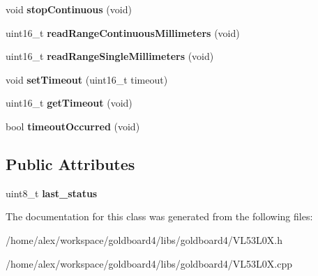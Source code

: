 \begin{DoxyCompactItemize}
\item 
void {\bfseries stop\+Continuous} (void)\hypertarget{class_v_l53_l0_x_aaa035aea7642fbf97e7946a1159ca5a5}{}\label{class_v_l53_l0_x_aaa035aea7642fbf97e7946a1159ca5a5}

\item 
uint16\+\_\+t {\bfseries read\+Range\+Continuous\+Millimeters} (void)\hypertarget{class_v_l53_l0_x_a198b2629c8d805ce23b2b2dd3c3cf7cf}{}\label{class_v_l53_l0_x_a198b2629c8d805ce23b2b2dd3c3cf7cf}

\item 
uint16\+\_\+t {\bfseries read\+Range\+Single\+Millimeters} (void)\hypertarget{class_v_l53_l0_x_a49e5ed380d53cbcedad7b96ec1eadb44}{}\label{class_v_l53_l0_x_a49e5ed380d53cbcedad7b96ec1eadb44}

\item 
void {\bfseries set\+Timeout} (uint16\+\_\+t timeout)\hypertarget{class_v_l53_l0_x_a421ae3c8aaad208e7e8c07c6f88cf486}{}\label{class_v_l53_l0_x_a421ae3c8aaad208e7e8c07c6f88cf486}

\item 
uint16\+\_\+t {\bfseries get\+Timeout} (void)\hypertarget{class_v_l53_l0_x_ac33d634573c44958b28ca42db5df0814}{}\label{class_v_l53_l0_x_ac33d634573c44958b28ca42db5df0814}

\item 
bool {\bfseries timeout\+Occurred} (void)\hypertarget{class_v_l53_l0_x_a7356434e330aa7c4243d75ec5349db5d}{}\label{class_v_l53_l0_x_a7356434e330aa7c4243d75ec5349db5d}

\end{DoxyCompactItemize}
\subsection*{Public Attributes}
\begin{DoxyCompactItemize}
\item 
uint8\+\_\+t {\bfseries last\+\_\+status}\hypertarget{class_v_l53_l0_x_af33d12ec0d1eb8630bb3473c07c2b853}{}\label{class_v_l53_l0_x_af33d12ec0d1eb8630bb3473c07c2b853}

\end{DoxyCompactItemize}


The documentation for this class was generated from the following files\+:\begin{DoxyCompactItemize}
\item 
/home/alex/workspace/goldboard4/libs/goldboard4/V\+L53\+L0\+X.\+h\item 
/home/alex/workspace/goldboard4/libs/goldboard4/V\+L53\+L0\+X.\+cpp\end{DoxyCompactItemize}

